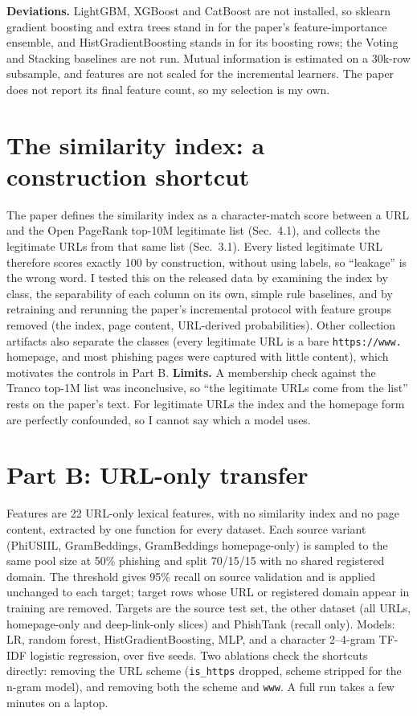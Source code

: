 \documentclass[10pt]{article}
\begin{document}
\textbf{Deviations.} LightGBM, XGBoost and CatBoost are not installed, so sklearn gradient boosting and extra trees stand in for the paper's feature-importance ensemble, and HistGradientBoosting stands in for its boosting rows; the Voting and Stacking baselines are not run. Mutual information is estimated on a 30k-row subsample, and features are not scaled for the incremental learners. The paper does not report its final feature count, so my selection is my own.

\section{The similarity index: a construction shortcut}
The paper defines the similarity index as a character-match score between a URL and the Open PageRank top-10M legitimate list (Sec.\ 4.1), and collects the legitimate URLs from that same list (Sec.\ 3.1). Every listed legitimate URL therefore scores exactly 100 by construction, without using labels, so ``leakage'' is the wrong word. I tested this on the released data by examining the index by class, the separability of each column on its own, simple rule baselines, and by retraining and rerunning the paper's incremental protocol with feature groups removed (the index, page content, URL-derived probabilities). Other collection artifacts also separate the classes (every legitimate URL is a bare \texttt{https://www.} homepage, and most phishing pages were captured with little content), which motivates the controls in Part B. \textbf{Limits.} A membership check against the Tranco top-1M list was inconclusive, so ``the legitimate URLs come from the list'' rests on the paper's text. For legitimate URLs the index and the homepage form are perfectly confounded, so I cannot say which a model uses.

\section{Part B: URL-only transfer}
Features are 22 URL-only lexical features, with no similarity index and no page content, extracted by one function for every dataset. Each source variant (PhiUSIIL, GramBeddings, GramBeddings homepage-only) is sampled to the same pool size at 50\% phishing and split 70/15/15 with no shared registered domain. The threshold gives 95\% recall on source validation and is applied unchanged to each target; target rows whose URL or registered domain appear in training are removed. Targets are the source test set, the other dataset (all URLs, homepage-only and deep-link-only slices) and PhishTank (recall only). Models: LR, random forest, HistGradientBoosting, MLP, and a character 2--4-gram TF-IDF logistic regression, over five seeds. Two ablations check the shortcuts directly: removing the URL scheme (\texttt{is\_https} dropped, scheme stripped for the n-gram model), and removing both the scheme and \texttt{www}. A full run takes a few minutes on a laptop.
\end{document}
